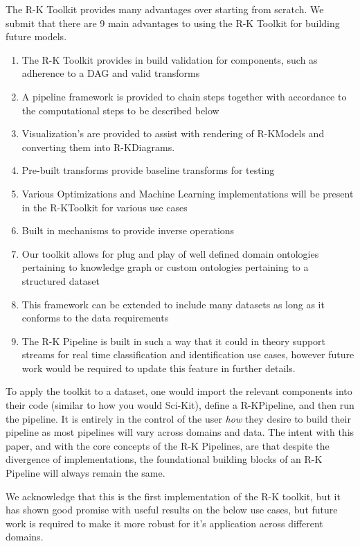 The R-K Toolkit provides many advantages over starting from scratch. We submit that there are 9 main advantages to using the R-K Toolkit for building future models.

\begin{enumerate}
    \item{The R-K Toolkit provides in build validation for components, such as adherence to a DAG and valid transforms}
    \item{A pipeline framework is provided to chain steps together with accordance to the computational steps to be described below}
    \item{Visualization's are provided to assist with rendering of R-KModels and converting them into R-KDiagrams.}
    \item{Pre-built transforms provide baseline transforms for testing }
    \item{Various Optimizations and Machine Learning implementations will be present in the R-KToolkit for various use cases}
    \item{Built in mechanisms to provide inverse operations}
    \item{Our toolkit allows for plug and play of well defined domain ontologies pertaining to knowledge graph or custom ontologies pertaining to a structured dataset}
    \item{This framework can be extended to include many datasets as long as it conforms to the data requirements}
    \item{The R-K Pipeline is built in such a way that it could in theory support streams for real time classification and identification use cases, however future work would be required to update this feature in further details.}
\end{enumerate}

To apply the toolkit to a dataset, one would import the relevant components into their code (similar to how you would Sci-Kit), define a R-KPipeline, and then run the pipeline. It is entirely in the control of the user \textit{how} they desire to build their pipeline as most pipelines will vary across domains and data. The intent with this paper, and with the core concepts of the R-K Pipelines, are that despite the divergence of implementations, the foundational building blocks of an R-K Pipeline will always remain the same.

We acknowledge that this is the first implementation of the R-K toolkit, but it has shown good promise with useful results on the below use cases, but future work is required to make it more robust for it's application across different domains.

